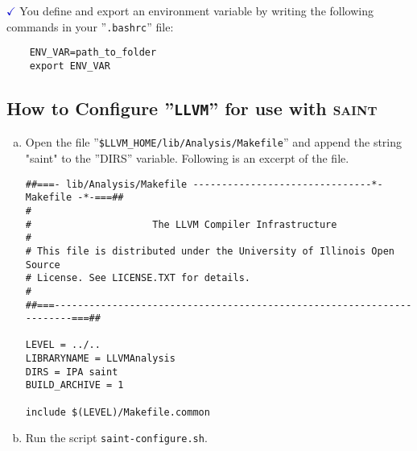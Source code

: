\documentclass[12pt,onecolumn,a4paper]{article}
\newcommand{\tool}[1]{\texttt{#1}\xspace}
\newcommand{\script}[1]{\texttt{#1}\xspace}
\newcommand{\env}[1]{\textcolor{firebrickred}{\text{#1}}\xspace}
\newcommand{\mycheckmark}[1]{\textcolor{#1}{$\checkmark$}}
\begin{document}
\mycheckmark{mediumblue} You define and export an environment variable \env{ENV\_VAR} by
writing the following commands in your ''\texttt{.bashrc}'' file:
\begin{verbatim}
	ENV_VAR=path_to_folder
	export ENV_VAR
\end{verbatim}

\subsection{How to Configure ''\tool{LLVM}'' for use with \textsc{saint}}
\begin{enumerate}[a)]	
	\item Open the file ''\texttt{\$LLVM\_HOME/lib/Analysis/Makefile}'' and
	append the string "saint" to the ''DIRS'' variable.
	Following is an excerpt of the file.\\
	
	\begin{verbatim}
##===- lib/Analysis/Makefile -------------------------------*- Makefile -*-===##
#
#                     The LLVM Compiler Infrastructure
#
# This file is distributed under the University of Illinois Open Source
# License. See LICENSE.TXT for details.
#
##===----------------------------------------------------------------------===##

LEVEL = ../..
LIBRARYNAME = LLVMAnalysis
DIRS = IPA saint
BUILD_ARCHIVE = 1

include $(LEVEL)/Makefile.common
	\end{verbatim}		
	
	\item Run the script \script{saint-configure.sh}.
\end{enumerate}
\end{document}
